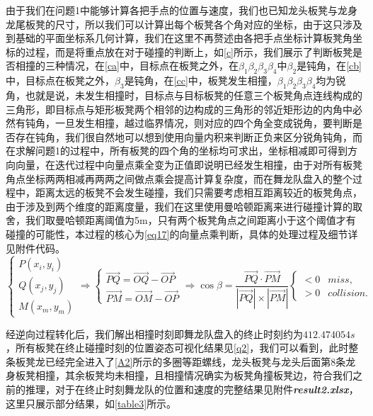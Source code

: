\documentclass[withoutpreface,bwprint]{cumcmthesis} %
\begin{document}
由于我们在问题1中能够计算各把手点的位置与速度，我们也已知龙头板凳与龙身龙尾板凳的尺寸，所以我们可以计算出每个板凳各个角对应的坐标，由于这只涉及到基础的平面坐标系几何计算，我们在这里不再赘述由各把手点坐标计算板凳角坐标的过程，而是将重点放在对于碰撞的判断上，如\cref{c}所示，我们展示了判断板凳是否相撞的三种情况，在\cref{ca}中，目标点在板凳之外，在$\beta_1\beta_2\beta_3\beta_4$中$\beta_2$是钝角，在\cref{cb}中，目标点在板凳之外，$\beta_3$是钝角，在\cref{cc}中，板凳发生相撞，$\beta_1\beta_2\beta_3\beta_4$均为锐角，也就是说，未发生相撞时，目标点与目标板凳的任意三个板凳角点连线构成的三角形，即目标点与矩形板凳两个相邻的边构成的三角形的邻近矩形边的内角中必然有钝角，一旦发生相撞，越过临界情况，则对应的四个角全变成锐角，要判断是否存在钝角，我们很自然地可以想到使用向量内积来判断正负来区分锐角钝角，而在求解问题1的过程中，所有板凳的四个角的坐标均可求出，坐标相减即可得到方向向量，在迭代过程中向量点乘全变为正值即说明已经发生相撞，由于对所有板凳角点坐标两两相减再两两之间做点乘会提高计算复杂度，而在舞龙队盘入的整个过程中，距离太远的板凳不会发生碰撞，我们只需要考虑相互距离较近的板凳角点，由于涉及到两个维度的距离度量，我们在这里使用曼哈顿距离来进行碰撞计算的取舍，我们取曼哈顿距离阈值为5m，只有两个板凳角点之间距离小于这个阈值才有碰撞的可能性，本过程的核心为\cref{eq17}的向量点乘判断，具体的处理过程及细节详见附件代码。
\begin{equation}
\begin{cases}
    P(x_i,y_i)\\
    Q(x_j,y_j)\\
    M(x_m,y_m)
\end{cases}
\!\!\!\!\!\!\!\!\!\!\!\!\Rightarrow\!
\begin{cases}
    \overrightarrow{PQ} = \overrightarrow{OQ}-\overrightarrow{OP}\\
    \overrightarrow{PM} = \overrightarrow{OM}-\overrightarrow{OP}
\end{cases}
\!\!\!\!\!\Rightarrow\!
\cos{\beta} = \frac{\overrightarrow{PQ}\cdot\overrightarrow{PM}}{|\overrightarrow{PQ}|\times|\overrightarrow{PM}|}
\begin{cases}
    < 0 & miss,\\
    > 0 & collision.
\end{cases}
\label{eq17}
\end{equation}

经逆向过程转化后，我们解出相撞时刻即舞龙队盘入的终止时刻约为$412.474054s$，所有板凳在终止碰撞时刻的位置姿态可视化结果见\cref{q2}，我们可以看到，此时整条板凳龙已经完全进入了\cref{A2}所示的多圈等距螺线，龙头板凳与龙头后面第8条龙身板凳相撞，其余板凳均未相撞，且相撞情况确实为板凳角撞板凳边，符合我们之前的推理，对于在终止时刻舞龙队的位置和速度的完整结果见附件\textbf{\textit{result2.xlsx}}，这里只展示部分结果，如\cref{table3}所示。
\end{document}
